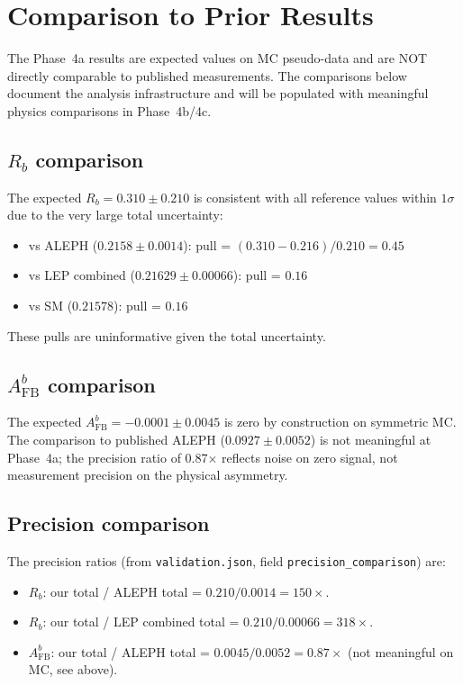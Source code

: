 \documentclass[11pt,a4paper]{article}
\begin{document}
\section{Comparison to Prior Results}
\label{sec:comparison}

The Phase~4a results are expected values on MC pseudo-data and are NOT directly
comparable to published measurements. The comparisons below document the analysis
infrastructure and will be populated with meaningful physics comparisons in
Phase~4b/4c.

\subsection{$R_b$ comparison}

The expected $R_b = 0.310 \pm 0.210$ is consistent with all reference values within
$1\sigma$ due to the very large total uncertainty:
\begin{itemize}
\item vs ALEPH ($0.2158 \pm 0.0014$): pull = $(0.310 - 0.216)/0.210 = 0.45$
\item vs LEP combined ($0.21629 \pm 0.00066$): pull = $0.16$
\item vs SM ($0.21578$): pull = $0.16$
\end{itemize}
These pulls are uninformative given the total uncertainty.

\subsection{$A_\mathrm{FB}^b$ comparison}

The expected $A_\mathrm{FB}^b = -0.0001 \pm 0.0045$ is zero by construction on
symmetric MC. The comparison to published ALEPH ($0.0927 \pm 0.0052$) is not meaningful
at Phase~4a; the precision ratio of 0.87$\times$ reflects noise on zero signal, not
measurement precision on the physical asymmetry.

\subsection{Precision comparison}
\label{sec:precision_comparison}

The precision ratios (from \texttt{validation.json}, field \texttt{precision\_comparison})
are:
\begin{itemize}
\item $R_b$: our total / ALEPH total = $0.210/0.0014 = 150\times$.
\item $R_b$: our total / LEP combined total = $0.210/0.00066 = 318\times$.
\item $A_\mathrm{FB}^b$: our total / ALEPH total = $0.0045/0.0052 = 0.87\times$
(not meaningful on MC, see above).
\end{itemize}
\end{document}
